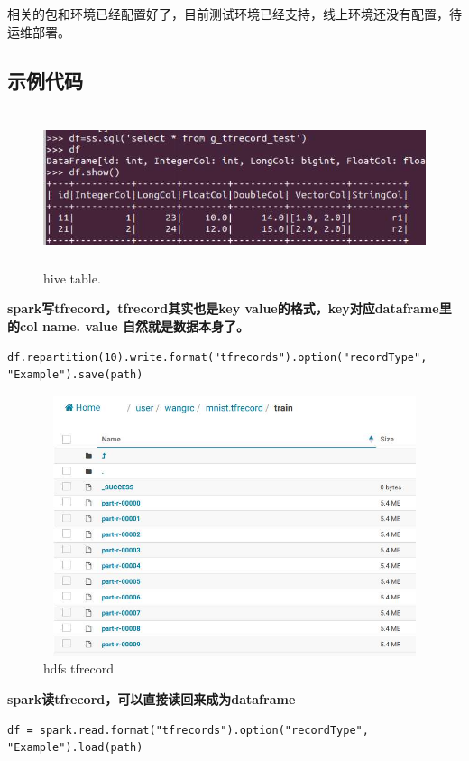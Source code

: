 \documentclass[12pt,a4paper,oneside]{article}
\begin{document}
\begin{CJK*}{UTF8}{gbsn}
相关的包和环境已经配置好了，目前测试环境已经支持，线上环境还没有配置，待运维部署。

\subsection{示例代码} 

\begin{figure}[h]
\centering
\includegraphics[width=5in,height=1.8in]{table}
\caption{hive table.}
\end{figure}

\textbf{spark写tfrecord，tfrecord其实也是key value的格式，key对应dataframe里的col name. value 自然就是数据本身了。} 
\begin{lstlisting}
df.repartition(10).write.format("tfrecords").option("recordType", "Example").save(path)
\end{lstlisting}

\begin{figure}[H]
\centering
\includegraphics[width=5in,height=3in]{hdfs}
\caption{ hdfs tfrecord}
\end{figure}


\textbf{spark读tfrecord，可以直接读回来成为dataframe}
\begin{lstlisting}
df = spark.read.format("tfrecords").option("recordType", "Example").load(path)
\end{lstlisting}


\end{CJK*}
\end{document}
